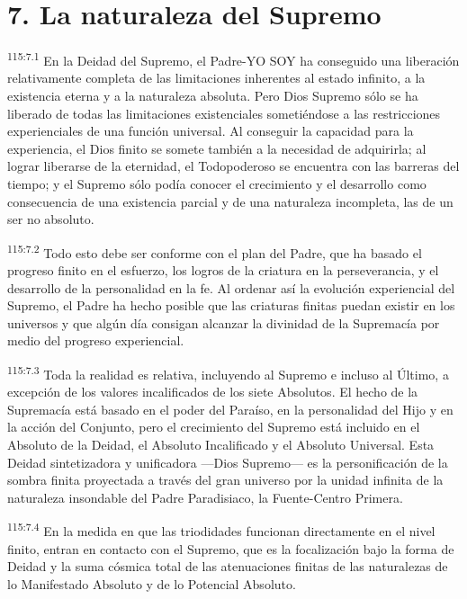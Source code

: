 \section*{7. La naturaleza del Supremo}
\par
\textsuperscript{115:7.1} En la Deidad del Supremo, el Padre-YO SOY ha conseguido una liberación relativamente completa de las limitaciones inherentes al estado infinito, a la existencia eterna y a la naturaleza absoluta. Pero Dios Supremo sólo se ha liberado de todas las limitaciones existenciales sometiéndose a las restricciones experienciales de una función universal. Al conseguir la capacidad para la experiencia, el Dios finito se somete también a la necesidad de adquirirla; al lograr liberarse de la eternidad, el Todopoderoso se encuentra con las barreras del tiempo; y el Supremo sólo podía conocer el crecimiento y el desarrollo como consecuencia de una existencia parcial y de una naturaleza incompleta, las de un ser no absoluto.

\par
\textsuperscript{115:7.2} Todo esto debe ser conforme con el plan del Padre, que ha basado el progreso finito en el esfuerzo, los logros de la criatura en la perseverancia, y el desarrollo de la personalidad en la fe. Al ordenar así la evolución experiencial del Supremo, el Padre ha hecho posible que las criaturas finitas puedan existir en los universos y que algún día consigan alcanzar la divinidad de la Supremacía por medio del progreso experiencial.

\par
\textsuperscript{115:7.3} Toda la realidad es relativa, incluyendo al Supremo e incluso al Último, a excepción de los valores incalificados de los siete Absolutos. El hecho de la Supremacía está basado en el poder del Paraíso, en la personalidad del Hijo y en la acción del Conjunto, pero el crecimiento del Supremo está incluido en el Absoluto de la Deidad, el Absoluto Incalificado y el Absoluto Universal. Esta Deidad sintetizadora y unificadora ---Dios Supremo--- es la personificación de la sombra finita proyectada a través del gran universo por la unidad infinita de la naturaleza insondable del Padre Paradisiaco, la Fuente-Centro Primera.

\par
\textsuperscript{115:7.4} En la medida en que las triodidades funcionan directamente en el nivel finito, entran en contacto con el Supremo, que es la focalización bajo la forma de Deidad y la suma cósmica total de las atenuaciones finitas de las naturalezas de lo Manifestado Absoluto y de lo Potencial Absoluto.

